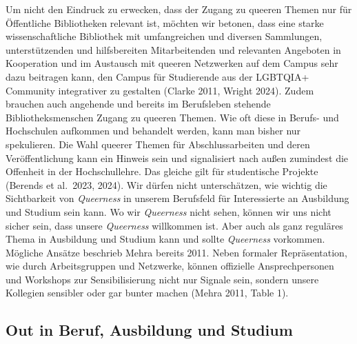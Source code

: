 \documentclass[a4paper,
fontsize=11pt,
oneside,
numbers=noperiodatend,
parskip=half-,
bibliography=totoc,
final
]{scrartcl}
\begin{document}
Um nicht den Eindruck zu erwecken, dass der Zugang zu queeren Themen nur
für Öffentliche Bibliotheken relevant ist, möchten wir betonen, dass
eine starke wissenschaftliche Bibliothek mit umfangreichen und diversen
Sammlungen, unterstützenden und hilfsbereiten Mitarbeitenden und
relevanten Angeboten in Kooperation und im Austausch mit queeren
Netzwerken auf dem Campus sehr dazu beitragen kann, den Campus für
Studierende aus der LGBTQIA+ Community integrativer zu gestalten (Clarke
2011, Wright 2024). Zudem brauchen auch angehende und bereits im
Berufsleben stehende Bibliotheksmenschen Zugang zu queeren Themen. Wie
oft diese in Berufs- und Hochschulen aufkommen und behandelt werden,
kann man bisher nur spekulieren. Die Wahl queerer Themen für
Abschlussarbeiten und deren Veröffentlichung kann ein Hinweis sein und
signalisiert nach außen zumindest die Offenheit in der Hochschullehre.
Das gleiche gilt für studentische Projekte (Berends et al.~2023, 2024).
Wir dürfen nicht unterschätzen, wie wichtig die Sichtbarkeit von
\emph{Queerness} in unserem Berufsfeld für Interessierte an Ausbildung
und Studium sein kann. Wo wir \emph{Queerness} nicht sehen, können wir
uns nicht sicher sein, dass unsere \emph{Queerness} willkommen ist. Aber
auch als ganz reguläres Thema in Ausbildung und Studium kann und sollte
\emph{Queerness} vorkommen. Mögliche Ansätze beschrieb Mehra bereits
2011. Neben formaler Repräsentation, wie durch Arbeitsgruppen und
Netzwerke, können offizielle Ansprechpersonen und Workshops zur
Sensibilisierung nicht nur Signale sein, sondern unsere Kollegien
sensibler oder gar bunter machen (Mehra 2011, Table 1).

\subsection{Out in Beruf, Ausbildung und
Studium}\label{out-in-beruf-ausbildung-und-studium}
\end{document}
